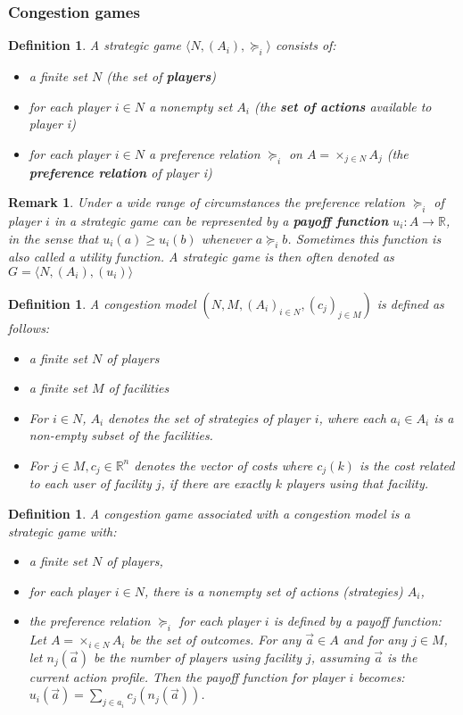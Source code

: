 \documentclass[a4paper,11pt]{article}
\newtheorem{definition}[theorem]{Definition}
\newtheorem{remark}[theorem]{Remark}
\newcommand{\R}{{\mathbb R}}
\begin{document}
\subsubsection{Congestion games}
\begin{definition}\cite{2}
A strategic game $\langle N, (A_i), \succeq_i\rangle$ consists of:
\begin{itemize}
  \item a finite set $N$  (the set of \textbf{players})
  \item for each player $i \in N$ a nonempty set $A_i$ (the \textbf{set of actions} available to player i)
  \item for each player $i \in N$ a preference relation $\succeq_i$ on $A=\times_{j\in N}A_j$ (the \textbf{preference relation} of player i)
\end{itemize}
\end{definition}
\begin{remark}
Under a wide range of circumstances the preference relation  $\succeq_i$ of player $i$ in a strategic game can be represented by a \textbf{payoff function} $u_i: A \rightarrow \R$, in the sense that $u_i(a) \geq u_i(b)$ whenever $a \succeq_i b$. Sometimes this function is also called a utility function. A strategic game is then often denoted as $G = \langle N, (A_i), (u_i)\rangle$
\end{remark}
\begin{definition}\cite{4}
A congestion model $(N, M, (A_i)_{i\in N}, (c_j)_{j\in M})$ is defined as follows:
\begin{itemize}
  \item a finite set $N$ of players
  \item a finite set $M$ of facilities
  \item For $i \in N$, $A_i$ denotes the set of strategies of player $i$, where each $a_i \in A_i$ is a non-empty subset of the facilities.
  \item For $j \in M, c_j \in \R^n$ denotes the vector of costs where $c_j(k)$ is the cost related to each user of facility $j$, if there are exactly $k$ players using that facility.
\end{itemize}
\end{definition}
\begin{definition}\cite{2,4}
A congestion game associated with a congestion model is a strategic game with:
\begin{itemize}
  \item a finite set $N$ of players,
  \item for each player $i \in N$, there is a nonempty set of actions (strategies) $A_i$,
  \item the preference relation $\succeq_i$ for each player $i$ is defined by a payoff function: Let $A =\times_{i\in N}A_i$ be the set of outcomes. For any $\vec{a} \in A$ and for any $j \in M$, let $n_j(\vec{a})$ be the number of players using facility $j$, assuming $\vec{a}$ is the current action profile.  Then the payoff function for player $i$ becomes: $u_i(\vec{a}) = \sum_{j\in a_i} c_j(n_j(\vec{a}))$.

\end{itemize}
\end{definition}
\end{document}
